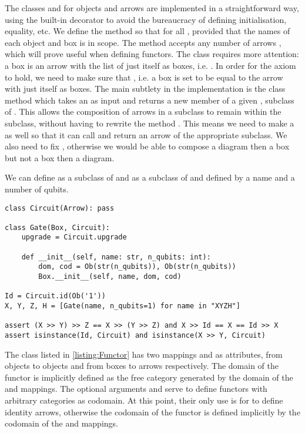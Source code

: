 The classes  and  for objects and arrows are implemented in a straightforward way, using the built-in  decorator to avoid the bureaucracy of defining initialisation, equality, etc.
We define the method  so that  for all , provided that the names of each object and box is in scope.
The method  accepts any number of arrows , which will prove useful when defining functors.
The  class requires more attention: a box  is an arrow with the list of just itself as boxes, i.e. .
In order for the axiom  to hold, we need to make sure that , i.e. a box is set to be equal to the arrow with just itself as boxes.
The main subtlety in the implementation is the class method  which takes an  as input and returns a new member of a given , subclass of .
This allows the composition of arrows in a subclass to remain within the subclass, without having to rewrite the method .
This means we need to make  a  as well so that it can call  and return an arrow of the appropriate subclass.
We also need to fix , otherwise we would be able to compose a diagram then a box but not a box then a diagram.

\begin{example}
We can define  as a subclass of  and  as a subclass of  and  defined by a name and a number of qubits.

\begin{verbatim}
class Circuit(Arrow): pass

class Gate(Box, Circuit):
    upgrade = Circuit.upgrade

    def __init__(self, name: str, n_qubits: int):
        dom, cod = Ob(str(n_qubits)), Ob(str(n_qubits))
        Box.__init__(self, name, dom, cod)

Id = Circuit.id(Ob('1'))
X, Y, Z, H = [Gate(name, n_qubits=1) for name in "XYZH"]

assert (X >> Y) >> Z == X >> (Y >> Z) and X >> Id == X == Id >> X
assert isinstance(Id, Circuit) and isinstance(X >> Y, Circuit)
\end{verbatim}
\end{example}

The  class listed in \ref{listing:Functor} has two mappings  and  as attributes, from objects to objects and from boxes to arrows respectively.
The domain of the functor is implicitly defined as the free category generated by the domain of the  and  mappings.
The optional arguments  and  serve to define functors with arbitrary categories as codomain.
At this point, their only use is for  to define identity arrows, otherwise the codomain of the functor is defined implicitly by the codomain of the  and  mappings.

